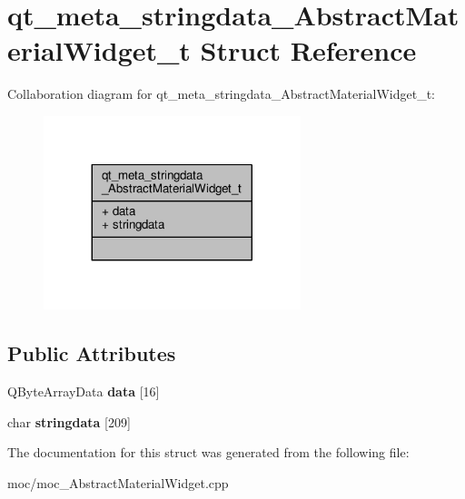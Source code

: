 \hypertarget{structqt__meta__stringdata___abstract_material_widget__t}{\section{qt\-\_\-meta\-\_\-stringdata\-\_\-\-Abstract\-Material\-Widget\-\_\-t Struct Reference}
\label{structqt__meta__stringdata___abstract_material_widget__t}
}


Collaboration diagram for qt\-\_\-meta\-\_\-stringdata\-\_\-\-Abstract\-Material\-Widget\-\_\-t\-:
\nopagebreak
\begin{figure}[H]
\begin{center}
\leavevmode
\includegraphics[width=212pt]{structqt__meta__stringdata___abstract_material_widget__t__coll__graph}
\end{center}
\end{figure}
\subsection*{Public Attributes}
\begin{DoxyCompactItemize}
\item 
\hypertarget{structqt__meta__stringdata___abstract_material_widget__t_a0331030fef0ac6bbc65c25d4850d3460}{Q\-Byte\-Array\-Data {\bfseries data} \mbox{[}16\mbox{]}}\label{structqt__meta__stringdata___abstract_material_widget__t_a0331030fef0ac6bbc65c25d4850d3460}

\item 
\hypertarget{structqt__meta__stringdata___abstract_material_widget__t_a58908236eeb22271f89b79917c74e10c}{char {\bfseries stringdata} \mbox{[}209\mbox{]}}\label{structqt__meta__stringdata___abstract_material_widget__t_a58908236eeb22271f89b79917c74e10c}

\end{DoxyCompactItemize}


The documentation for this struct was generated from the following file\-:\begin{DoxyCompactItemize}
\item 
moc/moc\-\_\-\-Abstract\-Material\-Widget.\-cpp\end{DoxyCompactItemize}
